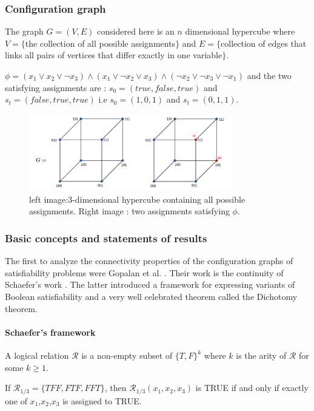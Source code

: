 \subsubsection{Configuration graph} 
\begin{defn}
The graph $G = (V,E)$ considered here is an $n$ dimensional hypercube where $V= \{$the collection of all possible assignments$\}$ and $E = \{$collection of edges that links all pairs of vertices that differ exactly in one variable$\}$. 
\end{defn}

\begin{example}
$\phi = (x_1 \vee x_2 \vee \neg x_3) \wedge (x_1 \vee \neg x_2 \vee x_3) \wedge (\neg x_2 \vee \neg x_3 \vee \neg x_1)$ and the two satisfying assignments are : 
$s_0 =(true, false, true) $ and $s_t =(false, true, true)$ i.e $s_0 = (1,0,1)$ and $s_t = (0,1,1)$.  \\

\begin{figure}[H]
\centering
\includegraphics[width=0.8\textwidth]{res/hypercube.png}
\caption{left image:3-dimensional hypercube containing all possible assignments. Right image : two assignments satisfying $\phi$.}
\label{fig:circle}
\end{figure}
\end{example}

\subsubsection{Basic concepts and statements of results}
The first to analyze the connectivity properties of the configuration graphs of satisfiability problems were Gopalan et al. \cite{gopalan_connectivity_2006}. Their work is the continuity of Schaefer's work \cite{schaefer_complexity_1978}. The latter introduced a framework for expressing variants of Boolean satisfiability and a very well celebrated theorem called the Dichotomy theorem. 

\paragraph{Schaefer's framework}
\begin{defn}
A logical relation $\mathcal{R}$ is a non-empty subset of $\{T,F\}^{k}$ where $k$ is the arity of $\mathcal{R}$ for some $k \geq 1$. 

\begin{example}
If $\mathcal{R}_{1/3} = \{TFF,FTF,FFT\}$, then  $\mathcal{R}_{1/3}(x_1,x_2,x_3)$ is TRUE if and only if exactly one of $x_1$,$x_2$,$x_3$ is assigned to TRUE. 
\end{example}
\end{defn}

